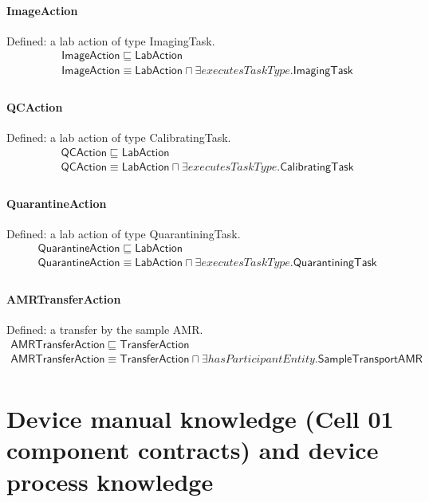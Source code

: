 \documentclass[10pt]{article}
\begin{document}
\paragraph{ImageAction} Defined: a lab action of type ImagingTask.
\[\begin{array}{l}
\mathsf{ImageAction} \sqsubseteq  \mathsf{LabAction} \\
\mathsf{ImageAction} \equiv  \mathsf{LabAction} \sqcap  \exists \mathit{executesTaskType}.\mathsf{ImagingTask} \\
\end{array}\]
\paragraph{QCAction} Defined: a lab action of type CalibratingTask.
\[\begin{array}{l}
\mathsf{QCAction} \sqsubseteq  \mathsf{LabAction} \\
\mathsf{QCAction} \equiv  \mathsf{LabAction} \sqcap  \exists \mathit{executesTaskType}.\mathsf{CalibratingTask} \\
\end{array}\]
\paragraph{QuarantineAction} Defined: a lab action of type QuarantiningTask.
\[\begin{array}{l}
\mathsf{QuarantineAction} \sqsubseteq  \mathsf{LabAction} \\
\mathsf{QuarantineAction} \equiv  \mathsf{LabAction} \sqcap  \exists \mathit{executesTaskType}.\mathsf{QuarantiningTask} \\
\end{array}\]
\paragraph{AMRTransferAction} Defined: a transfer by the sample AMR.
\[\begin{array}{l}
\mathsf{AMRTransferAction} \sqsubseteq  \mathsf{TransferAction} \\
\mathsf{AMRTransferAction} \equiv  \mathsf{TransferAction} \sqcap  \exists \mathit{hasParticipantEntity}.\mathsf{SampleTransportAMR} \\
\end{array}\]
\section*{Device manual knowledge (Cell 01 component contracts) and device process knowledge}
\end{document}
